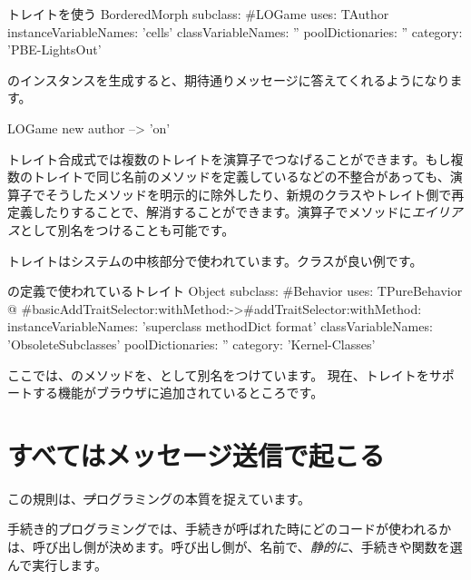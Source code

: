 \documentclass[a4paper,10pt,twoside]{book}
\begin{document}
\begin{classdef}[sbegamewithtrait]{トレイトを使う}
BorderedMorph subclass: #LOGame
	uses: TAuthor
	instanceVariableNames: 'cells'
	classVariableNames: ''
	poolDictionaries: ''
	category: 'PBE-LightsOut'
\end{classdef}

のインスタンスを生成すると、期待通りメッセージに答えてくれるようになります。

\begin{code}{}
LOGame new author --> 'on'
\end{code}

トレイト合成式では複数のトレイトを\ct{+}演算子でつなげることができます。もし複数のトレイトで同じ名前のメソッドを定義しているなどの不整合があっても、\ct{-}演算子でそうしたメソッドを明示的に除外したり、新規のクラスやトレイト側で再定義したりすることで、解消することができます。演算子でメソッドに\emph{エイリアス}として別名をつけることも可能です。

トレイトはシステムの中核部分で使われています。\mbox{}クラスが良い例です。

\begin{classdef}[behaviorwithtraits]{の定義で使われているトレイト}
Object subclass: #Behavior
	uses: TPureBehavior @ {#basicAddTraitSelector:withMethod:->#addTraitSelector:withMethod:}
	instanceVariableNames: 'superclass methodDict format'
	classVariableNames: 'ObsoleteSubclasses'
	poolDictionaries: ''
	category: 'Kernel-Classes'
\end{classdef}
\noindent
ここでは、のメソッドを、として別名をつけています。
現在、トレイトをサポートする機能がブラウザに追加されているところです。


\section{すべてはメッセージ送信で起こる}


この規則は、\st プログラミングの本質を捉えています。

手続き的プログラミングでは、手続きが呼ばれた時にどのコードが使われるかは、呼び出し側が決めます。呼び出し側が、名前で、\emph{静的に}、手続きや関数を選んで実行します。
\end{document}
